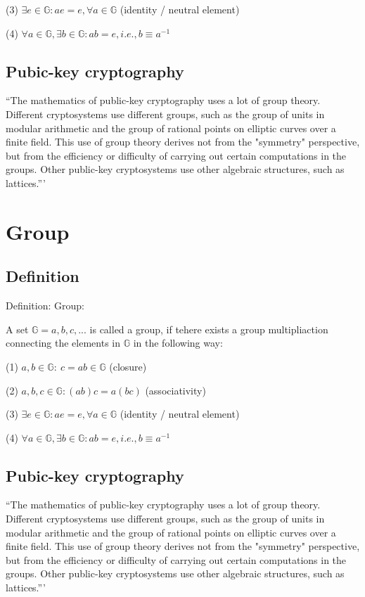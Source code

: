 \documentclass[twocolumn]{article}
\begin{document}
(3) $\exists e \in \mathbb{G}: ae=e, \forall a \in \mathbb{G}$ (identity / neutral element)

(4) $\forall a \in \mathbb{G}, \exists b \in \mathbb{G}: ab=e, i.e., b\equiv a^{-1}$

\subsection{Pubic-key cryptography}
``The mathematics of public-key cryptography uses a lot of group theory. Different cryptosystems use different groups, such as the group of units in modular arithmetic and the group of rational points on elliptic curves over a finite field. This use of group theory derives not from the "symmetry" perspective, but from the efficiency or difficulty of carrying out certain computations in the groups. Other public-key cryptosystems use other algebraic structures, such as lattices.''' \cite{Cardelli:1996:TS:234313.234418}
\section{Group}
\subsection{Definition}
Definition: Group\cite{Cardelli:1996:TS:234313.234418}:

A set $\mathbb{G}={a, b, c, ...}$ is called a group, if tehere exists a group multipliaction connecting the elements in $\mathbb{G}$ in the following way:

(1) $a, b \in \mathbb{G}:\ c=a b \in \mathbb{G}$ (closure)

(2) $a, b, c \in \mathbb{G}: (ab)c=a(bc)$ (associativity)

(3) $\exists e \in \mathbb{G}: ae=e, \forall a \in \mathbb{G}$ (identity / neutral element)

(4) $\forall a \in \mathbb{G}, \exists b \in \mathbb{G}: ab=e, i.e., b\equiv a^{-1}$

\subsection{Pubic-key cryptography}
``The mathematics of public-key cryptography uses a lot of group theory. Different cryptosystems use different groups, such as the group of units in modular arithmetic and the group of rational points on elliptic curves over a finite field. This use of group theory derives not from the "symmetry" perspective, but from the efficiency or difficulty of carrying out certain computations in the groups. Other public-key cryptosystems use other algebraic structures, such as lattices.''' \cite{Cardelli:1996:TS:234313.234418}
\end{document}
